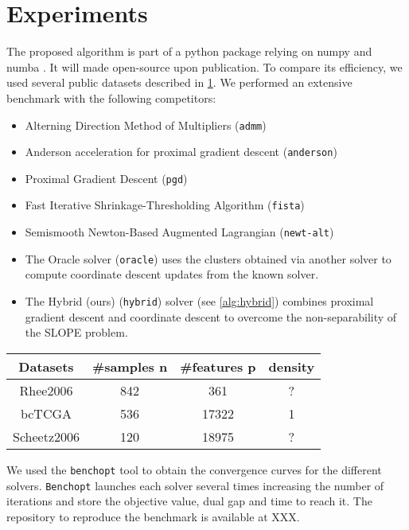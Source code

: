 \section{Experiments}\label{sec:experiments}

The proposed algorithm is part of a python package relying on numpy and numba \cite{harris2020,lam2015}.
It will made open-source upon publication. To compare its efficiency, we used several public datasets described in \cref{table:datasets}.
We performed an extensive benchmark with the following competitors:
\begin{itemize}[noitemsep]
    \item Alterning Direction Method of Multipliers (\texttt{admm}) \cite{boyd2010}
    \item Anderson acceleration for proximal gradient descent (\texttt{anderson}) \cite{zhang2020}
    \item Proximal Gradient Descent (\texttt{pgd}) \cite{combettes2005}
    \item Fast Iterative Shrinkage-Thresholding Algorithm (\texttt{fista}) \cite{beck2009}
    \item Semismooth Newton-Based Augmented Lagrangian (\texttt{newt-alt}) \cite{Ziyan2019}
    \item The Oracle solver (\texttt{oracle}) uses the clusters obtained via another
     solver to compute coordinate descent updates from the known solver.
    \item The Hybrid (ours) (\texttt{hybrid}) solver (see \cref{alg:hybrid}) combines proximal gradient descent
     and coordinate descent to overcome the non-separability of the SLOPE problem.
\end{itemize}

\begin{table}[]
    \centering
    \label{table:datasets}
    \begin{tabular}{cccc}
    \hline
    Datasets    & \#samples n & \#features p & density \\ \hline
    Rhee2006    & 842         & 361          & ?       \\ 
    bcTCGA      & 536         & \num{17322}        & 1       \\
    Scheetz2006 & 120         & \num{18975}        & ?       \\ \hline
    \end{tabular}
\end{table}

We used the \texttt{benchopt} \cite{moreau2022benchopt} tool to obtain the convergence curves for the different solvers.
\texttt{Benchopt} launches each solver several times increasing the number of iterations and store the objective value, dual gap and time to reach it.
The repository to reproduce the benchmark is available at XXX.

